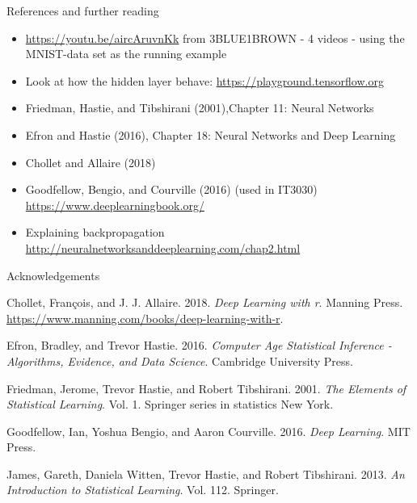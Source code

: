 \documentclass[
  10pt,
  ignorenonframetext,
  twocolumn]{beamer}
\providecommand{\tightlist}{%
  \setlength{\itemsep}{0pt}\setlength{\parskip}{0pt}}
\newlength{\cslhangindent}
\newenvironment{CSLReferences}[2] %
 {\begin{list}{}{%
  \setlength{\itemindent}{0pt}
  \setlength{\leftmargin}{0pt}
  \setlength{\parsep}{0pt}
  \ifodd #1
   \setlength{\leftmargin}{\cslhangindent}
   \setlength{\itemindent}{-1\cslhangindent}
  \fi
  \setlength{\itemsep}{#2\baselineskip}}}
 {\end{list}}
\begin{document}
\begin{frame}{References and further reading}
\label{references-and-further-reading}
\begin{itemize}
\tightlist
\item
  \url{https://youtu.be/aircAruvnKk} from 3BLUE1BROWN - 4 videos - using
  the MNIST-data set as the running example
\item
  Look at how the hidden layer behave:
  \url{https://playground.tensorflow.org}
\item
  Friedman, Hastie, and Tibshirani (2001),Chapter 11: Neural Networks
\item
  Efron and Hastie (2016), Chapter 18: Neural Networks and Deep Learning
\item
  Chollet and Allaire (2018)
\item
  Goodfellow, Bengio, and Courville (2016) (used in IT3030)
  \url{https://www.deeplearningbook.org/}
\item
  Explaining backpropagation
  \url{http://neuralnetworksanddeeplearning.com/chap2.html}
\end{itemize}
\end{frame}

\begin{frame}{Acknowledgements}
\label{acknowledgements-1}
\label{refs}
\begin{CSLReferences}{1}{0}
Chollet, François, and J. J. Allaire. 2018. \emph{Deep Learning with r}.
Manning Press. \url{https://www.manning.com/books/deep-learning-with-r}.

Efron, Bradley, and Trevor Hastie. 2016. \emph{Computer Age Statistical
Inference - Algorithms, Evidence, and Data Science}. Cambridge
University Press.

Friedman, Jerome, Trevor Hastie, and Robert Tibshirani. 2001. \emph{The
Elements of Statistical Learning}. Vol. 1. Springer series in statistics
New York.

Goodfellow, Ian, Yoshua Bengio, and Aaron Courville. 2016. \emph{Deep
Learning}. MIT Press.

James, Gareth, Daniela Witten, Trevor Hastie, and Robert Tibshirani.
2013. \emph{An Introduction to Statistical Learning}. Vol. 112.
Springer.

\end{CSLReferences}
\end{frame}
\end{document}
